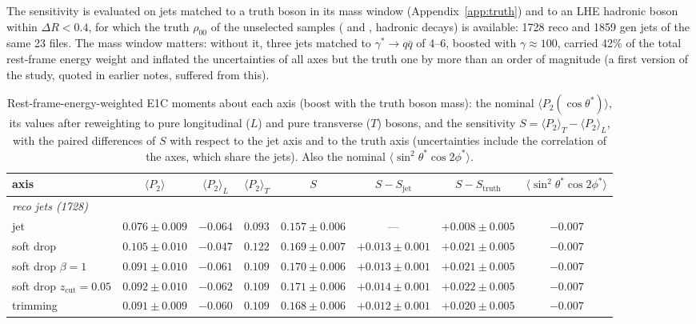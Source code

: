 The sensitivity is evaluated on jets matched to a truth boson in its mass window (Appendix~\ref{app:truth}) and to an
LHE hadronic boson within $\Delta R < 0.4$, for which the truth $\rho_{00}$ of the unselected samples
( and , hadronic decays) is available: 1728 reco and 1859 gen jets of the same 23
files. The mass window matters: without it, three jets matched to $\gamma^*\to q\bar q$ of 4--6\GeV, boosted with
$\gamma \approx 100$, carried 42\% of the total rest-frame energy weight and inflated the uncertainties of all axes but
the truth one by more than an order of magnitude (a first version of the study, quoted in earlier notes, suffered from this).

\begin{table}[htbp]
\centering
\caption{Rest-frame-energy-weighted E1C moments about each axis (boost with the truth boson mass): the nominal
$\langle P_2(\cos\theta^*)\rangle$, its values after reweighting to pure longitudinal ($L$) and pure transverse ($T$)
bosons, and the sensitivity $S = \langle P_2\rangle_T - \langle P_2\rangle_L$, with the paired differences of $S$ with
respect to the jet axis and to the truth axis (uncertainties include the correlation of the axes, which share the jets).
Also the nominal $\langle\sin^2\theta^*\cos2\phi^*\rangle$.}
\label{tab:axisresults}
\scriptsize
\setlength{\tabcolsep}{2.5pt}
\begin{tabular}{lccccccc}
\toprule
axis & $\langle P_2\rangle$ & $\langle P_2\rangle_L$ & $\langle P_2\rangle_T$ & $S$ & $S - S_\mathrm{jet}$ & $S - S_\mathrm{truth}$ & $\langle\sin^2\theta^*\cos2\phi^*\rangle$ \\
\midrule
\multicolumn{8}{l}{\emph{reco jets (1728)}} \\
jet & $0.076 \pm 0.009$ & $-0.064$ & $0.093$ & $0.157 \pm 0.006$ & --- & $+0.008 \pm 0.005$ & $-0.007$ \\
soft drop & $0.105 \pm 0.010$ & $-0.047$ & $0.122$ & $0.169 \pm 0.007$ & $+0.013 \pm 0.001$ & $+0.021 \pm 0.005$ & $-0.007$ \\
soft drop $\beta = 1$ & $0.091 \pm 0.010$ & $-0.061$ & $0.109$ & $0.170 \pm 0.006$ & $+0.013 \pm 0.001$ & $+0.021 \pm 0.005$ & $-0.007$ \\
soft drop $z_\mathrm{cut} = 0.05$ & $0.092 \pm 0.010$ & $-0.062$ & $0.109$ & $0.171 \pm 0.006$ & $+0.014 \pm 0.001$ & $+0.022 \pm 0.005$ & $-0.007$ \\
trimming & $0.091 \pm 0.009$ & $-0.060$ & $0.109$ & $0.168 \pm 0.006$ & $+0.012 \pm 0.001$ & $+0.020 \pm 0.005$ & $-0.007$ \\

\end{tabular}
\end{table}
